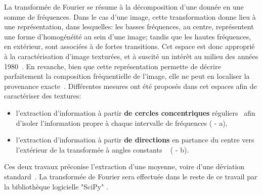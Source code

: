 La transformée de Fourier se résume à la décomposition d'une donnée en une somme de fréquences. Dans le cas d'une image, cette transformation donne lieu à une représentation, dans lesquelles: les basses fréquences, au centre, représentent une forme d'homogénéité au sein d'une image; tandis que les hautes fréquences, en extérieur, sont associées à de fortes transitions. Cet espace est donc approprié à la caractérisation d'image texturées, et à suscité un intérêt au milieu des années 1980~\cite{Persoon1986}. En revanche, bien que cette représentation permette de décrire parfaitement la composition fréquentielle de l'image, elle ne peut en localiser la provenance exacte~\cite{Wiltgen2008}. Différentes  mesures ont été proposés dans cet espaces afin de caractériser des textures:
\begin{itemize}
    \item l'extraction d'information à partir \textbf{de cercles concentriques} réguliers~\cite{Smach2008a, Wiltgen2008} afin d'isoler l'information propre à chaque intervalle de fréquences ( - a),
    \item l'extraction d'information à partir \textbf{de directions} en partance du centre vers l'extérieur de la transformée à angles constants ~\cite{Wiltgen2008} ( - b).
\end{itemize}
Ces deux travaux préconise l'extraction d'une moyenne, voire d'une déviation standard~\cite{Smach2008a, Wiltgen2008}. La transformée de Fourier sera effectuée dans le reste de ce travail par la bibliothèque logicielle "SciPy" \cite{Jo}.\par\par

